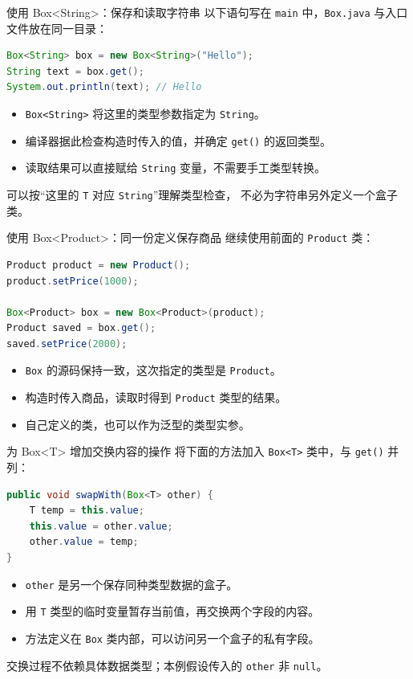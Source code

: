 \documentclass[aspectratio=169]{beamer}
\begin{document}
\begin{frame}[fragile]{使用 Box<String>：保存和读取字符串}
  以下语句写在 \texttt{main} 中，\texttt{Box.java} 与入口文件放在同一目录：
  \begin{lstlisting}[language=Java]
Box<String> box = new Box<String>("Hello");
String text = box.get();
System.out.println(text); // Hello
  \end{lstlisting}
  \begin{itemize}
    \item \texttt{Box<String>} 将这里的类型参数指定为 \texttt{String}。
    \item 编译器据此检查构造时传入的值，并确定 \texttt{get()} 的返回类型。
    \item 读取结果可以直接赋给 \texttt{String} 变量，不需要手工类型转换。
  \end{itemize}
  \medskip
  可以按“这里的 \texttt{T} 对应 \texttt{String}”理解类型检查，
  不必为字符串另外定义一个盒子类。
\end{frame}

\begin{frame}[fragile]{使用 Box<Product>：同一份定义保存商品}
  继续使用前面的 \texttt{Product} 类：
  \begin{lstlisting}[language=Java]
Product product = new Product();
product.setPrice(1000);

Box<Product> box = new Box<Product>(product);
Product saved = box.get();
saved.setPrice(2000);
  \end{lstlisting}
  \begin{itemize}
    \item \texttt{Box} 的源码保持一致，这次指定的类型是 \texttt{Product}。
    \item 构造时传入商品，读取时得到 \texttt{Product} 类型的结果。
    \item 自己定义的类，也可以作为泛型的类型实参。
  \end{itemize}
\end{frame}

\begin{frame}[fragile]{为 Box<T> 增加交换内容的操作}
  将下面的方法加入 \texttt{Box<T>} 类中，与 \texttt{get()} 并列：
  \begin{lstlisting}[language=Java]
public void swapWith(Box<T> other) {
    T temp = this.value;
    this.value = other.value;
    other.value = temp;
}
  \end{lstlisting}
  \begin{itemize}
    \item \texttt{other} 是另一个保存同种类型数据的盒子。
    \item 用 \texttt{T} 类型的临时变量暂存当前值，再交换两个字段的内容。
    \item 方法定义在 \texttt{Box} 类内部，可以访问另一个盒子的私有字段。
  \end{itemize}
  \medskip
  交换过程不依赖具体数据类型；本例假设传入的 \texttt{other} 非 \texttt{null}。
\end{frame}
\end{document}
